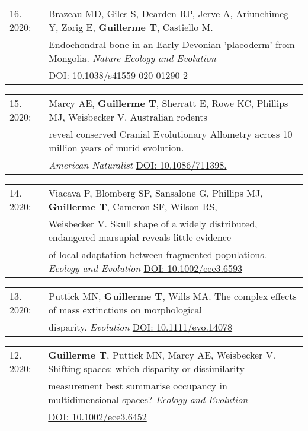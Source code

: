 \documentclass[10pt,a4paper]{article}
\begin{document}
{\begin{tabular}{ll}
16. 2020: & Brazeau MD, Giles S, Dearden RP, Jerve A, Ariunchimeg Y, Zorig E, \textbf{Guillerme T}, Castiello M.\\
      & Endochondral bone in an Early Devonian 'placoderm' from Mongolia. \textit{Nature Ecology and Evolution}\\
      & \href{https://www.nature.com/articles/s41559-020-01290-2}{DOI: 10.1038/s41559-020-01290-2}\\
\end{tabular}
\bigskip

\begin{tabular}{ll}
15. 2020: & Marcy AE, \textbf{Guillerme T}, Sherratt E, Rowe KC, Phillips MJ, Weisbecker V. Australian rodents\\
      & reveal conserved Cranial Evolutionary Allometry across 10 million years of murid evolution.\\
      & \textit{American Naturalist} \href{https://www.journals.uchicago.edu/doi/abs/10.1086/711398?journalCode=an}{DOI: 10.1086/711398.}\\
\end{tabular}
\bigskip

\begin{tabular}{ll}
14. 2020: & Viacava P, Blomberg SP, Sansalone G, Phillips MJ, \textbf{Guillerme T}, Cameron SF, Wilson RS,\\
      & Weisbecker V. Skull shape of a widely distributed, endangered marsupial reveals little evidence\\
      & of local adaptation between fragmented populations. \textit{Ecology and Evolution} \href{https://onlinelibrary.wiley.com/doi/full/10.1002/ece3.6593}{DOI: 10.1002/ece3.6593}\\
\end{tabular}
\bigskip

\begin{tabular}{ll}
13. 2020: & Puttick MN, \textbf{Guillerme T}, Wills MA. The complex effects of mass extinctions on morphological\\
          & disparity. \textit{Evolution} \href{https://onlinelibrary.wiley.com/doi/abs/10.1111/evo.14078}{DOI: 10.1111/evo.14078}\\
\end{tabular}
\bigskip

\begin{tabular}{ll}
12. 2020: & \textbf{Guillerme T}, Puttick MN, Marcy AE, Weisbecker V. Shifting spaces: which disparity or dissimilarity\\
      & measurement best summarise occupancy in multidimensional spaces? \textit{Ecology and Evolution}\\
      & \href{https://onlinelibrary.wiley.com/doi/full/10.1002/ece3.6452}{DOI: 10.1002/ece3.6452}\\
\end{tabular}
\bigskip

}
\end{document}
